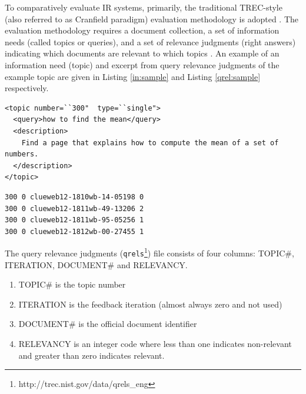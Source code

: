 To comparatively evaluate IR systems, primarily, the traditional TREC-style (also referred to as Cranfield paradigm) evaluation methodology is adopted \citep{trec}.
The evaluation methodology requires a document collection, a set of information needs (called topics or queries), and a set of relevance judgments (right answers) indicating which documents are relevant to which topics \citep{cranfield}.
An example of an information need (topic) and excerpt from query relevance judgments of the example topic are given in Listing \ref{in:sample} and Listing \ref{qrel:sample} respectively.
\\
\begin{lstlisting}
<topic number=``300"  type=``single">
  <query>how to find the mean</query>
  <description>
  	Find a page that explains how to compute the mean of a set of numbers.
  </description> 
</topic>
\end{lstlisting}



\begin{lstlisting}
300 0 clueweb12-1810wb-14-05198 0
300 0 clueweb12-1811wb-49-13206 2
300 0 clueweb12-1811wb-95-05256 1
300 0 clueweb12-1812wb-00-27455 1
\end{lstlisting}


The query relevance judgments (\texttt{qrels}\footnote{http://trec.nist.gov/data/qrels\_eng}) file consists of four columns: TOPIC\#, ITERATION, DOCUMENT\# and RELEVANCY. 

\begin{enumerate}
\item TOPIC\# is the topic number
\item ITERATION is the feedback iteration (almost always zero and not used)
\item DOCUMENT\# is the official document identifier
\item RELEVANCY is an integer code where less than one indicates non-relevant and greater than zero indicates relevant.
\end{enumerate}

